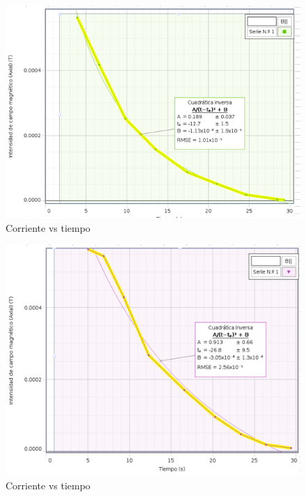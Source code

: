 \documentclass{article}
\begin{document}
\begin{figure}[H]
   \centering
   \includegraphics[scale=0.4]{../imgs/a3.png}
   \caption{Corriente vs tiempo}
   \label{Fig:4}
\end{figure}


\begin{figure}[H]
   \centering
   \includegraphics[scale=0.4]{../imgs/a4.png}
   \caption{Corriente vs tiempo}
   \label{Fig:5}
\end{figure}
\end{document}
